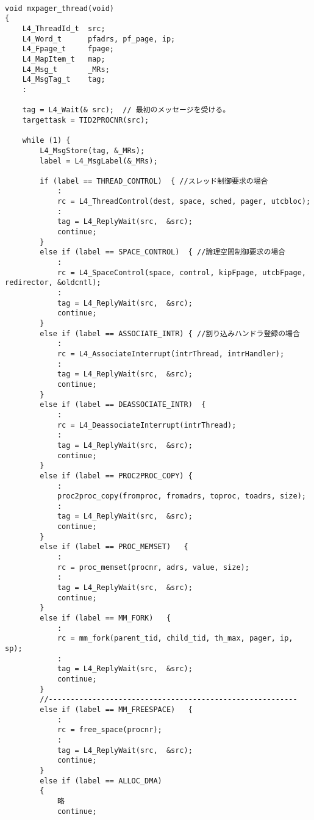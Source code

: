 {\footnotesize
\begin{verbatim}

void mxpager_thread(void) 
{
    L4_ThreadId_t  src;
    L4_Word_t      pfadrs, pf_page, ip;
    L4_Fpage_t     fpage;
    L4_MapItem_t   map;
    L4_Msg_t       _MRs;
    L4_MsgTag_t    tag;
    :

    tag = L4_Wait(& src);  // 最初のメッセージを受ける。
    targettask = TID2PROCNR(src);

    while (1) {
        L4_MsgStore(tag, &_MRs);
        label = L4_MsgLabel(&_MRs); 

        if (label == THREAD_CONTROL)  { //スレッド制御要求の場合
            :
            rc = L4_ThreadControl(dest, space, sched, pager, utcbloc);
            :
            tag = L4_ReplyWait(src,  &src);
            continue;
        }
        else if (label == SPACE_CONTROL)  { //論理空間制御要求の場合
            :
            rc = L4_SpaceControl(space, control, kipFpage, utcbFpage, redirector, &oldcntl);
            :
            tag = L4_ReplyWait(src,  &src);
            continue;
        }
        else if (label == ASSOCIATE_INTR) { //割り込みハンドラ登録の場合
            :
            rc = L4_AssociateInterrupt(intrThread, intrHandler);
            : 
            tag = L4_ReplyWait(src,  &src);
            continue;
        }
        else if (label == DEASSOCIATE_INTR)  {
            :
            rc = L4_DeassociateInterrupt(intrThread); 
            :
            tag = L4_ReplyWait(src,  &src);
            continue;
        }
        else if (label == PROC2PROC_COPY) {
            :
            proc2proc_copy(fromproc, fromadrs, toproc, toadrs, size);
            :
            tag = L4_ReplyWait(src,  &src);
            continue;
        }
        else if (label == PROC_MEMSET)   {
            :	  
            rc = proc_memset(procnr, adrs, value, size);
            :
            tag = L4_ReplyWait(src,  &src);
            continue;
        }
        else if (label == MM_FORK)   {
            :
            rc = mm_fork(parent_tid, child_tid, th_max, pager, ip, sp);
            :
            tag = L4_ReplyWait(src,  &src);
            continue;
        }
        //---------------------------------------------------------
        else if (label == MM_FREESPACE)   {
            :
            rc = free_space(procnr);
            :
            tag = L4_ReplyWait(src,  &src);
            continue;
        }
        else if (label == ALLOC_DMA)
        {
            略
            continue;

\end{verbatim}}
